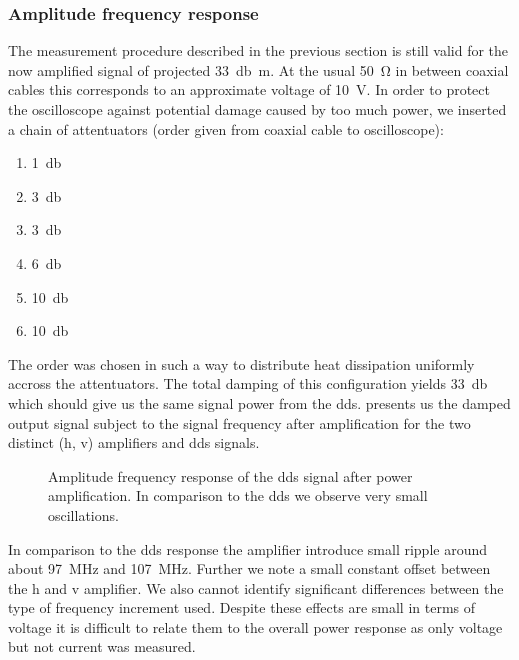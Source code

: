\subsubsection{Amplitude frequency response}\label{subsec:electronic_amplitude_frequency_response}

The measurement procedure described in the previous section is still valid
for the now amplified signal of projected \SI{33}{\decibel\meter}. At the
usual \SI{50}{\ohm} in between coaxial cables this corresponds to an
approximate voltage of \SI{10}{\volt}. In order to protect the oscilloscope
against potential damage caused by too much power, we inserted a chain of
attentuators (order given from coaxial cable to oscilloscope):
\begin{enumerate}
  \item \SI{1}{\decibel}
  \item \SI{3}{\decibel}
  \item \SI{3}{\decibel}
  \item \SI{6}{\decibel}
  \item \SI{10}{\decibel}
  \item \SI{10}{\decibel}
\end{enumerate}
The order was chosen in such a way to distribute heat dissipation uniformly
accross the attentuators. The total damping of this configuration yields
\SI{33}{\decibel} which should give us the same signal power from the
\gls{dds}.  presents us the damped
output signal subject to the signal frequency after amplification for the two
distinct (\gls{h}, \gls{v}) amplifiers and \gls{dds} signals.
\begin{figure}[htb]
  \centering
  \begin{adjustbox}{width=\textwidth}
    
  \end{adjustbox}
  \caption{Amplitude frequency response of the \gls{dds} signal after power
    amplification. In comparison to the \gls{dds} we observe very small
    oscillations.
  }\label{fig:signal_amplification_response}
\end{figure}
In comparison to the \gls{dds} response the amplifier introduce small ripple
around about \SI{97}{\mega\hertz} and \SI{107}{\mega\hertz}. Further we note
a small constant offset between the \gls{h} and \gls{v} amplifier. We also
cannot identify significant differences between the type of frequency
increment used. Despite these effects are small in terms of voltage it is
difficult to relate them to the overall power response as only voltage but
not current was measured.

